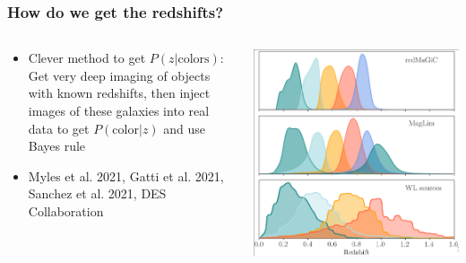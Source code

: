 \documentclass{beamer}
\begin{document}
\frame
{
    \frametitle{How do we get the redshifts?}


    \begin{columns}
        \begin{column}{0.5\textwidth}    
            \begin{itemize}

                \item Clever method to get $P(z | \mathrm{colors})$: Get very
                    deep imaging of objects with known redshifts, then inject
                    images of these galaxies into real data to get
                    $P(\mathrm{color} | z)$ and use Bayes rule

                \item Myles et al. 2021, Gatti et al.
                    2021, Sanchez et al. 2021, DES Collaboration

            \end{itemize}
        \end{column}
        \begin{column}{0.5\textwidth}
            \begin{center}
                \includegraphics[width=\textwidth]{nz.png}
            \end{center}
        \end{column}
    \end{columns}


}
\end{document}
